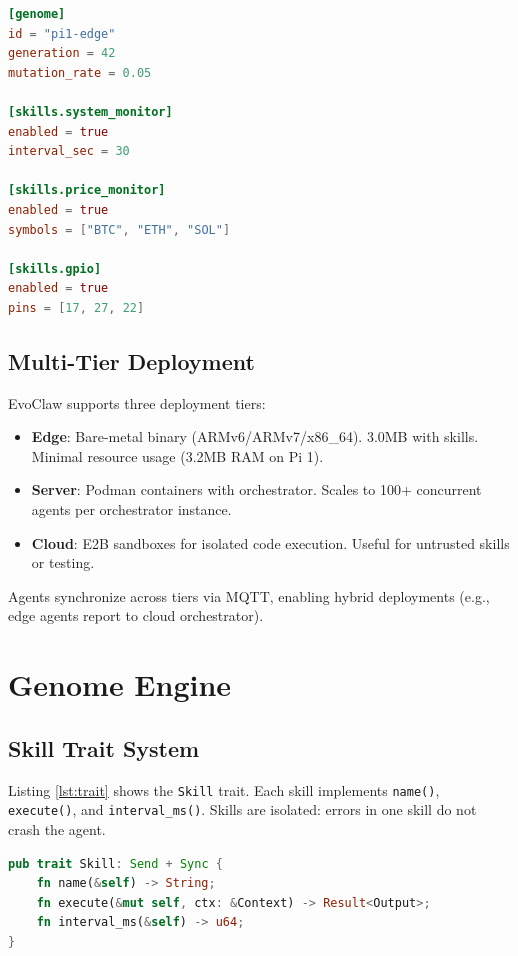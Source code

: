 \documentclass{article}
\begin{document}
\begin{lstlisting}[language=toml, caption={Example \texttt{genome.toml}}, label={lst:genome}]
[genome]
id = "pi1-edge"
generation = 42
mutation_rate = 0.05

[skills.system_monitor]
enabled = true
interval_sec = 30

[skills.price_monitor]
enabled = true
symbols = ["BTC", "ETH", "SOL"]

[skills.gpio]
enabled = true
pins = [17, 27, 22]
\end{lstlisting}

\subsection{Multi-Tier Deployment}

EvoClaw supports three deployment tiers:

\begin{itemize}
    \item \textbf{Edge}: Bare-metal binary (ARMv6/ARMv7/x86\_64). 3.0MB with skills. Minimal resource usage (3.2MB RAM on Pi 1).
    
    \item \textbf{Server}: Podman containers with orchestrator. Scales to 100+ concurrent agents per orchestrator instance.
    
    \item \textbf{Cloud}: E2B sandboxes \cite{e2b} for isolated code execution. Useful for untrusted skills or testing.
\end{itemize}

Agents synchronize across tiers via MQTT, enabling hybrid deployments (e.g., edge agents report to cloud orchestrator).

\section{Genome Engine}\label{sec:genome}

\subsection{Skill Trait System}

Listing \ref{lst:trait} shows the \texttt{Skill} trait. Each skill implements \texttt{name()}, \texttt{execute()}, and \texttt{interval\_ms()}. Skills are isolated: errors in one skill do not crash the agent.

\begin{lstlisting}[language=rust, caption={Skill trait definition}, label={lst:trait}]
pub trait Skill: Send + Sync {
    fn name(&self) -> String;
    fn execute(&mut self, ctx: &Context) -> Result<Output>;
    fn interval_ms(&self) -> u64;
}
\end{lstlisting}
\end{document}
